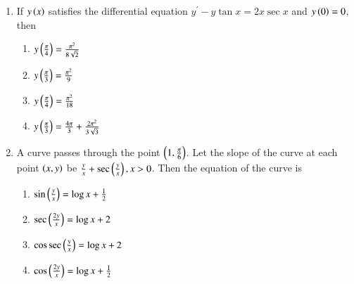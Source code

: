 \documentclass[journal,12pt,twocolumn]{IEEEtran}
\theoremstyle{remark}
\begin{document}
\begin{enumerate}
\item  If $y\left(x\right)$ satisfies the differential equation $y^\prime - y \tan x = 2x \sec x $ and $y\left(0\right) = 0 $, then \hfill {}

\begin{multicols}{2}
\begin{enumerate}
    \item $ y\left(\frac{\pi}{4}\right) = \frac{\pi^2}{8\sqrt{2}} $
    \item $ y\left(\frac{\pi}{3}\right) = \frac{\pi^2}{9} $
    \item $ y\left(\frac{\pi}{4}\right) = \frac{\pi^2}{18} $
    \item $ y\left(\frac{\pi}{3}\right) = \frac{4\pi}{3} + \frac{2\pi^2}{3\sqrt{3}} $
\end{enumerate}
\end{multicols}

\item A curve passes through the point $ \left(1,\frac{\pi}{6}\right) $. Let the slope of the curve at each point $ \left(x, y\right) $ be $ \frac{y}{x} + \sec\left(\frac{y}{x}\right), x > 0 $. Then the equation of the curve is \hfill {}

\begin{multicols}{2}
\begin{enumerate}
    \item $ \sin\left(\frac{y}{x}\right) = \log x + \frac{1}{2} $
    \item $\sec\left(\frac{2y}{x}\right) = \log x + 2$
    \item $\cos\sec\left(\frac{y}{x}\right) = \log x + 2 $
    \item $ \cos\left(\frac{2y}{x}\right) = \log x + \frac{1}{2} $
\end{enumerate}
\end{multicols}
\end{enumerate}
\end{document}
